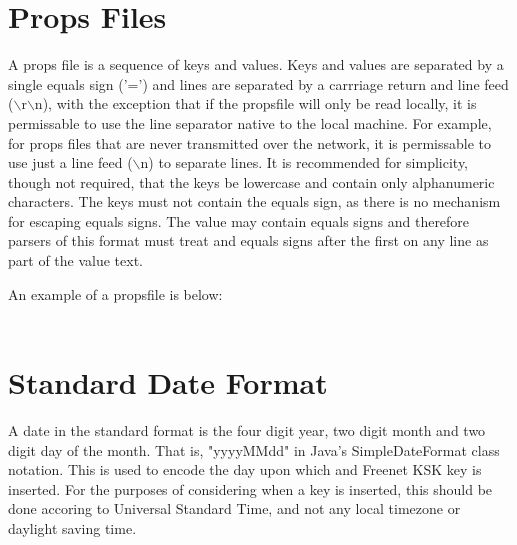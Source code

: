 \documentclass[12pt,a4paper]{article}
\begin{document}
\appendix

\section{Props Files}
\label{PropsFile}
A props file is a sequence of keys and values. Keys and values are separated by a single equals sign ('=') and lines are separated by a carrriage return and line feed ($\backslash$r$\backslash$n), with the exception that if the propsfile will only be read locally, it is permissable to use the line separator native to the local machine. For example, for props files that are never transmitted over the network, it is permissable to use just a line feed ($\backslash$n) to separate lines. It is recommended for simplicity, though not required, that the keys be lowercase and contain only alphanumeric characters. The keys must not contain the equals sign, as there is no mechanism for escaping equals signs. The value may contain equals signs and therefore parsers of this format must treat and equals signs after the first on any line as part of the value text.

An example of a propsfile is below: \\
\\

\section{Standard Date Format}
\label{standard_date}
A date in the standard format is the four digit year, two digit month and two digit day of the month. That is, "yyyyMMdd" in Java's SimpleDateFormat class notation. This is used to encode the day upon which and Freenet KSK key is inserted. For the purposes of considering when a key is inserted, this should be done accoring to Universal Standard Time, and not any local timezone or daylight saving time.
\end{document}
